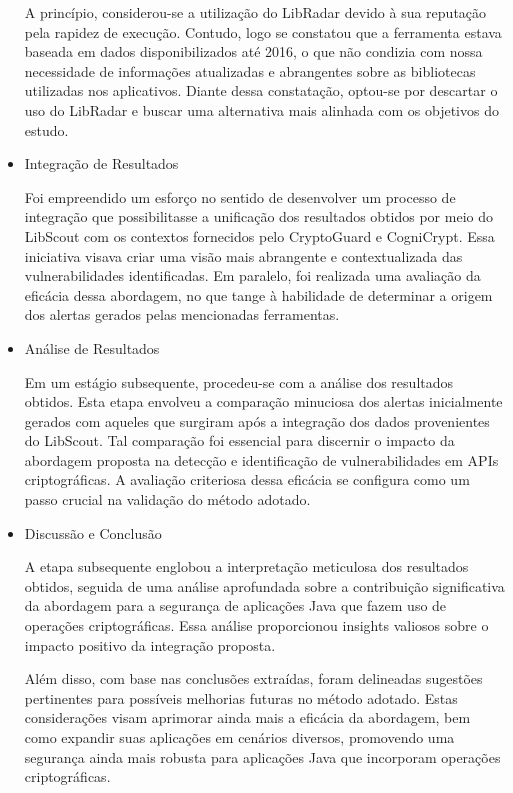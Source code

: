 \begin{itemize}
A princípio, considerou-se a utilização do LibRadar devido à sua reputação pela rapidez de execução. Contudo, logo se constatou que a ferramenta estava baseada em dados disponibilizados até 2016, o que não condizia com nossa necessidade de informações atualizadas e abrangentes sobre as bibliotecas utilizadas nos aplicativos. Diante dessa constatação, optou-se por descartar o uso do LibRadar e buscar uma alternativa mais alinhada com os objetivos do estudo.

\item{Integração de Resultados}

Foi empreendido um esforço no sentido de desenvolver um processo de integração que possibilitasse a unificação dos resultados obtidos por meio do LibScout com os contextos fornecidos pelo CryptoGuard e CogniCrypt. Essa iniciativa visava criar uma visão mais abrangente e contextualizada das vulnerabilidades identificadas. Em paralelo, foi realizada uma avaliação da eficácia dessa abordagem, no que tange à habilidade de determinar a origem dos alertas gerados pelas mencionadas ferramentas.

\item{Análise de Resultados}

Em um estágio subsequente, procedeu-se com a análise dos resultados obtidos. Esta etapa envolveu a comparação minuciosa dos alertas inicialmente gerados com aqueles que surgiram após a integração dos dados provenientes do LibScout. Tal comparação foi essencial para discernir o impacto da abordagem proposta na detecção e identificação de vulnerabilidades em APIs criptográficas. A avaliação criteriosa dessa eficácia se configura como um passo crucial na validação do método adotado.
\item{Discussão e Conclusão}

A etapa subsequente englobou a interpretação meticulosa dos resultados obtidos, seguida de uma análise aprofundada sobre a contribuição significativa da abordagem para a segurança de aplicações Java que fazem uso de operações criptográficas. Essa análise proporcionou insights valiosos sobre o impacto positivo da integração proposta.

Além disso, com base nas conclusões extraídas, foram delineadas sugestões pertinentes para possíveis melhorias futuras no método adotado. Estas considerações visam aprimorar ainda mais a eficácia da abordagem, bem como expandir suas aplicações em cenários diversos, promovendo uma segurança ainda mais robusta para aplicações Java que incorporam operações criptográficas.

\end{itemize}

